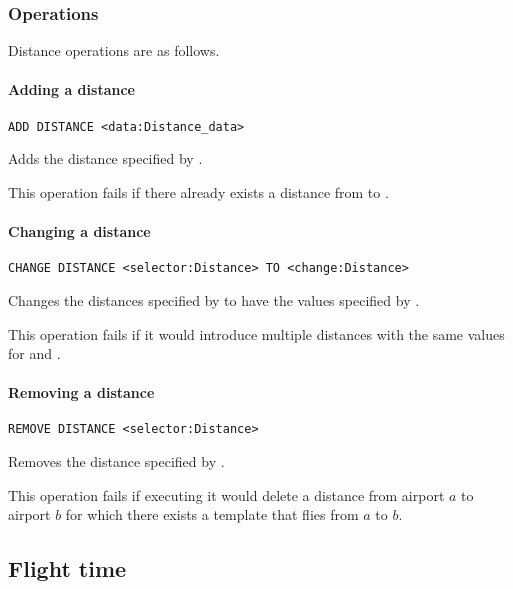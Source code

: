 \subsubsection{Operations}
Distance operations are as follows.

\paragraph{Adding a distance}
\begin{operation}
  \lstinline{ADD DISTANCE <data:Distance_data>}
  \label{op:add_distance}
\end{operation}
Adds the distance specified by .

This operation fails if there already exists a distance from  to
.

\paragraph{Changing a distance}
\begin{operation}
  \lstinline{CHANGE DISTANCE <selector:Distance> TO <change:Distance>}
  \label{op:change_distance}
\end{operation}
Changes the distances specified by  to have the values specified
by .

This operation fails if it would introduce multiple distances with the same
values for  and .

\paragraph{Removing a distance}
\begin{operation}
  \lstinline{REMOVE DISTANCE <selector:Distance>}
  \label{op:remove_distance}
\end{operation}
Removes the distance specified by .

This operation fails if executing it would delete a distance from airport $a$ to
airport $b$ for which there exists a template that flies from $a$ to $b$.

\subsection{Flight time}
